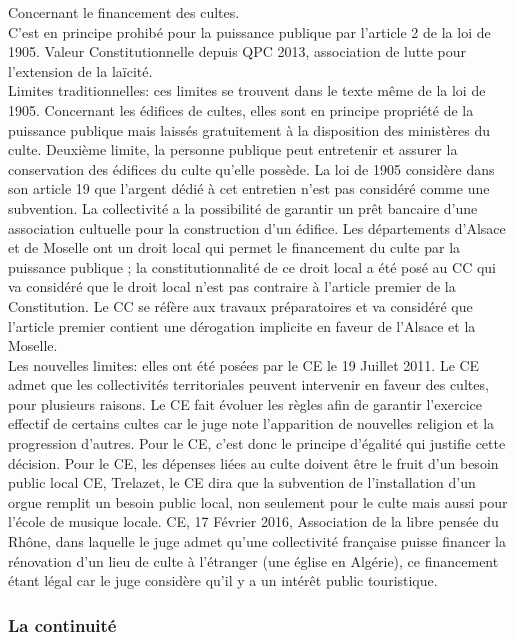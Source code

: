 \documentclass[10pt, a4paper, openany]{book}
\begin{document}
Concernant le financement des cultes. \\ 
C'est en principe prohibé pour la puissance publique par l'article 2 de la loi de 1905. Valeur Constitutionnelle depuis QPC 2013, association de lutte pour l'extension de la laïcité. \\
Limites traditionnelles: ces limites se trouvent dans le texte même de la loi de 1905. Concernant les édifices de cultes, elles sont en principe propriété de la puissance publique mais laissés gratuitement à la disposition des ministères du culte. Deuxième limite, la personne publique peut entretenir et assurer la conservation des édifices du culte qu'elle possède. La loi de 1905 considère dans son article 19 que l'argent dédié à cet entretien n'est pas considéré comme une subvention. La collectivité a la possibilité de garantir un prêt bancaire d'une association cultuelle pour la construction d'un édifice. Les départements d'Alsace et de Moselle ont un droit local qui permet le financement du culte par la puissance publique ; la constitutionnalité de ce droit local a été posé au CC qui va considéré que le droit local n'est pas contraire à l'article premier de la Constitution. Le CC se réfère aux travaux préparatoires et va considéré que l'article premier contient une dérogation implicite en faveur de l'Alsace et la Moselle. \\
Les nouvelles limites: elles ont été posées par le CE le 19 Juillet 2011. Le CE admet que les collectivités territoriales peuvent intervenir en faveur des cultes, pour plusieurs raisons. Le CE fait évoluer les règles afin de garantir l'exercice effectif de certains cultes car le juge note l'apparition de nouvelles religion et la progression d'autres. Pour le CE, c'est donc le principe d'égalité qui justifie cette décision. Pour le CE, les dépenses liées au culte doivent être le fruit d'un besoin public local CE, Trelazet, le CE dira que la subvention de l'installation d'un orgue remplit un besoin public local, non seulement pour le culte mais aussi pour l'école de musique locale. CE, 17 Février 2016, Association de la libre pensée du Rhône, dans laquelle le juge admet qu'une collectivité française puisse financer la rénovation d'un lieu de culte à l'étranger (une église en Algérie), ce financement étant légal car le juge considère qu'il y a un intérêt public touristique. 

\subsubsection{La continuité}
\end{document}
